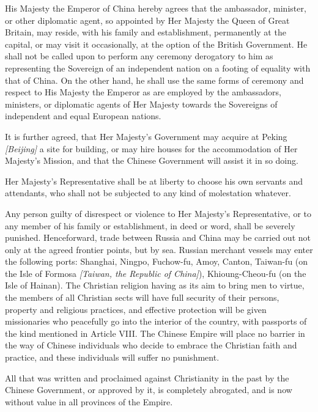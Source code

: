 \begin{fancyquote}
	\vspace*{0.5em}
	\vspace*{0.5em}
	His Majesty the Emperor of China hereby agrees that the ambassador, minister, or other diplomatic agent, so appointed by Her Majesty the Queen of Great Britain, may reside, with his family and establishment, permanently at the capital, or may visit it occasionally, at the option of the British Government. He shall not be called upon to perform any ceremony derogatory to him as representing the Sovereign of an independent nation on a footing of equality with that of China. On the other hand, he shall use the same forms of ceremony and respect to His Majesty the Emperor as are employed by the ambassadors, ministers, or diplomatic agents of Her Majesty towards the Sovereigns of independent and equal European nations.
	
	It is further agreed, that Her Majesty's Government may acquire at Peking \emph{[Beijing]} a site for building, or may hire houses for the accommodation of Her Majesty's Mission, and that the Chinese Government will assist it in so doing.
	
	Her Majesty's Representative shall be at liberty to choose his own servants and attendants, who shall not be subjected to any kind of molestation whatever.
	
	Any person guilty of disrespect or violence to Her Majesty's Representative, or to any member of his family or establishment, in deed or word, shall be severely punished. 
	Henceforward, trade between Russia and China may be carried out not only at the agreed frontier points, but by sea. Russian merchant vessels may enter the following ports: Shanghai, Ningpo, Fuchow-fu, Amoy, Canton, Taiwan-fu (on the Isle of Formosa \emph{[Taiwan, the Republic of China]}), Khioung-Cheou-fu (on the Isle of Hainan).
	The Christian religion having as its aim to bring men to virtue, the members of all Christian sects will have full security of their persons, property and religious practices, and effective protection will be given missionaries who peacefully go into the interior of the country, with passports of the kind mentioned in Article VIII. The Chinese Empire will place no barrier in the way of Chinese individuals who decide to embrace the Christian faith and practice, and these individuals will suffer no punishment.

	All that was written and proclaimed against Christianity in the past by the Chinese Government, or approved by it, is completely abrogated, and is now without value in all provinces of the Empire. \emph{\autocite{Chassiron:1861}}
\end{fancyquote}
